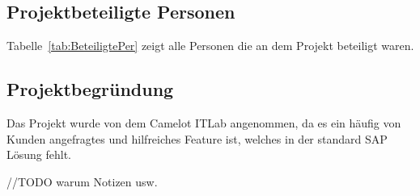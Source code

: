\subsection{Projektbeteiligte Personen} 
\label{sec:Projektbeteiligte Personen}
Tabelle~\ref{tab:BeteiligtePer} zeigt alle Personen die an dem Projekt beteiligt waren.

\subsection{Projektbegründung} 
\label{sec:Projektbegruendung}
Das Projekt wurde von dem Camelot ITLab angenommen, da es ein häufig von Kunden angefragtes und hilfreiches Feature ist, welches in der standard SAP Lösung fehlt.

//TODO warum Notizen usw.